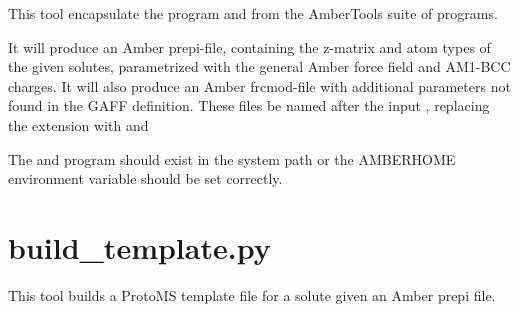 \documentclass[letterpaper,10pt,english]{sphinxmanual}
\begin{document}

This tool encapsulate the program  and  from the AmberTools suite of programs.

It will produce an Amber prepi-file, containing the z-matrix and atom types of the given solutes, parametrized with the general Amber force field and AM1-BCC charges. It will also produce an Amber frcmod-file with additional parameters not found in the GAFF definition. These files be named after the input , replacing the extension  with  and 

The  and  program should exist in the system path or the AMBERHOME environment variable should be set correctly.


\section{build\_template.py}
\label{\detokenize{tools:build-template-py}}

%
\begin{sphinxVerbatim}[commandchars=\\\{\}]
  
    
        
        
\end{sphinxVerbatim}


This tool builds a ProtoMS template file for a solute given an Amber prepi file.
\end{document}
